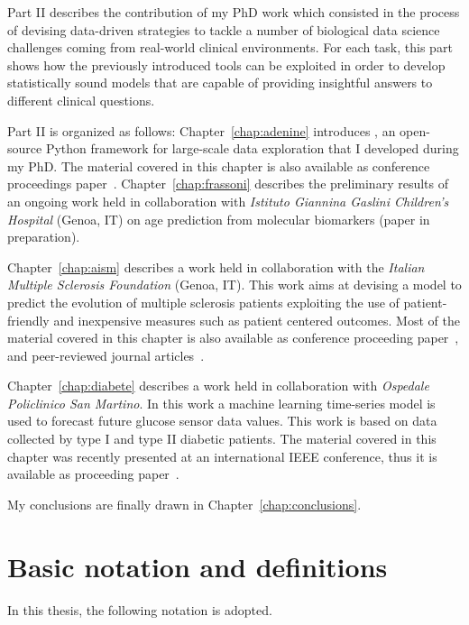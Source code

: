 Part II describes the contribution of my PhD work which consisted in the process of devising data-driven strategies to tackle a number of biological data science challenges coming from real-world clinical environments. For each task, this part shows how the previously introduced tools can be exploited in order to develop statistically sound models that are capable of providing insightful answers to different clinical questions.

Part II is organized as follows:
Chapter~\ref{chap:adenine} introduces \ade, an open-source Python framework for large-scale data exploration that I developed during my PhD.
The material covered in this chapter is also available as conference proceedings paper~\cite{fiorini2017adenine}.
Chapter~\ref{chap:frassoni} describes the preliminary results of an ongoing work held in collaboration with \textit{Istituto Giannina Gaslini Children's Hospital} (Genoa, IT) on age prediction from molecular biomarkers (paper in preparation).

Chapter~\ref{chap:aism} describes a work held in collaboration with the \textit{Italian Multiple Sclerosis Foundation} (Genoa, IT). This work aims at devising a model to predict the evolution of multiple sclerosis patients exploiting the use of patient-friendly and inexpensive measures such as patient centered outcomes.
Most of the material covered in this chapter is also available as conference proceeding paper~\cite{fiorini2015machine}, and peer-reviewed journal articles~\cite{brichetto2015improving, fiorini2016temporal, brichetto2016predicting, pmlr-v68-fiorini17a, tacchino2017multiple}.

Chapter~\ref{chap:diabete} describes a work held in collaboration with \textit{Ospedale Policlinico San Martino}. In this work a machine learning time-series model is used to forecast future glucose sensor data values. This work is based on data collected by type I and type II diabetic patients.
The material covered in this chapter was recently presented at an international IEEE conference, thus it is available as proceeding paper~\cite{fiorini2017data}.

My conclusions are finally drawn in Chapter~\ref{chap:conclusions}.

\chapter{Basic notation and definitions} \label{sec:notation}
In this thesis, the following notation is adopted.

